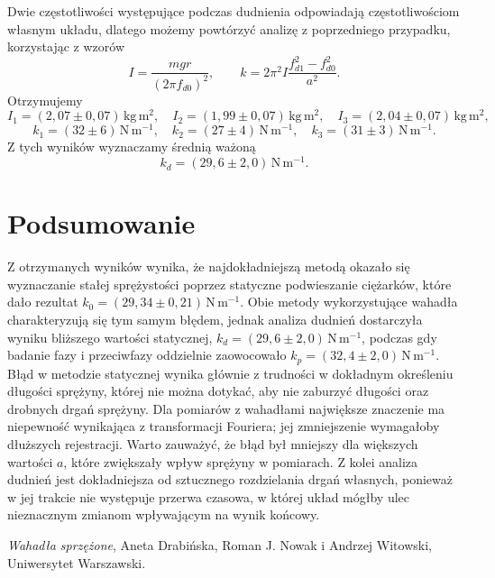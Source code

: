 \documentclass[12pt]{article}
\begin{document}
Dwie częstotliwości występujące podczas dudnienia odpowiadają częstotliwościom własnym układu\cite{skrypt}, dlatego możemy powtórzyć analizę z poprzedniego przypadku, korzystając z wzorów
\[
	I = \frac{mgr}{(2\pi f_{d0})^2}, \qquad
	k = 2\pi^2 I \frac{f_{d1}^2 - f_{d0}^2}{a^2}.
\]
Otrzymujemy
\[
	I_1 = (2{,}07 \pm 0{,}07)\,\mathrm{kg\,m^2}, \quad
	I_2 = (1{,}99 \pm 0{,}07)\,\mathrm{kg\,m^2}, \quad
	I_3 = (2{,}04 \pm 0{,}07)\,\mathrm{kg\,m^2},
\]
\[
	k_1 = (32 \pm 6)\,\mathrm{N\,m^{-1}}, \quad
	k_2 = (27 \pm 4)\,\mathrm{N\,m^{-1}}, \quad
	k_3 = (31 \pm 3)\,\mathrm{N\,m^{-1}}.
\]
Z tych wyników wyznaczamy średnią ważoną
\[
	k_d = (29{,}6 \pm 2{,}0)\,\mathrm{N\,m^{-1}}.
\]

\section{Podsumowanie}
Z otrzymanych wyników wynika, że najdokładniejszą metodą okazało się wyznaczanie stałej sprężystości poprzez statyczne podwieszanie ciężarków, które dało rezultat \(k_0 = (29{,}34 \pm 0{,}21)\,\mathrm{N\,m^{-1}}\). Obie metody wykorzystujące wahadła charakteryzują się tym samym błędem, jednak analiza dudnień dostarczyła wyniku bliższego wartości statycznej, \(k_d = (29{,}6 \pm 2{,}0)\,\mathrm{N\,m^{-1}}\), podczas gdy badanie fazy i przeciwfazy oddzielnie zaowocowało \(k_p = (32{,}4 \pm 2{,}0)\,\mathrm{N\,m^{-1}}\). Błąd w metodzie statycznej wynika głównie z trudności w dokładnym określeniu długości sprężyny, której nie można dotykać, aby nie zaburzyć długości oraz drobnych drgań sprężyny. Dla pomiarów z wahadłami największe znaczenie ma niepewność wynikająca z transformacji Fouriera; jej zmniejszenie wymagałoby dłuższych rejestracji. Warto zauważyć, że błąd był mniejszy dla większych wartości \(a\), które zwiększały wpływ sprężyny w pomiarach. Z kolei analiza dudnień jest dokładniejsza od sztucznego rozdzielania drgań własnych, ponieważ w jej trakcie nie występuje przerwa czasowa, w której układ mógłby ulec nieznacznym zmianom wpływającym na wynik końcowy.

\newpage

\begin{thebibliography}{1}

	\emph{Wahadła sprzężone}, Aneta Drabińska, Roman J. Nowak i Andrzej Witowski, Uniwersytet Warszawski.

\end{thebibliography}
\end{document}
